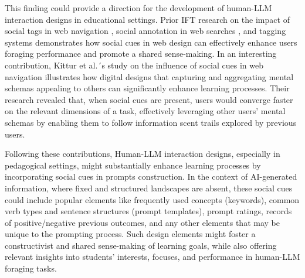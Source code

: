 \documentclass[sn-mathphys, Numbered]{sn-jnl}%
\theoremstyle{thmstyleone}%
\theoremstyle{thmstyletwo}%
\theoremstyle{thmstylethree}%
\begin{document}
This finding could provide a direction for the development of human-LLM interaction designs in educational settings. Prior IFT research on the impact of social tags in web navigation \parencite{held_learning_2012, held_using_2010},  social annotation in web searches \parencite{fisher_distributed_2012}, and tagging systems \parencite{cress_collective_2013} demonstrates how social cues in web design can effectively enhance users foraging performance and promote a shared sense-making. In an interesting contribution, Kittur et al.´s \parencite*{kittur_standing_2014} study on the influence of social cues in web navigation illustrates how digital designs that capturing and aggregating mental schemas appealing to others can significantly enhance learning processes. Their research revealed that, when social cues are present, users would converge faster on the relevant dimensions of a task, effectively leveraging other users' mental schemas by enabling them to follow information scent trails explored by previous users. 

Following these contributions, Human-LLM interaction designs, especially in pedagogical settings, might substantially enhance learning processes by incorporating social cues in prompts construction. In the context of AI-generated information, where fixed and structured landscapes are absent, these social cues could include popular elements like frequently used concepts (keywords), common verb types and sentence structures (prompt templates), prompt ratings, records of positive/negative previous outcomes, and any other elements that may be unique to the prompting process. Such design elements might foster a constructivist and shared sense-making of learning goals, while also offering relevant insights into students' interests, focuses, and performance in human-LLM foraging tasks.
\end{document}
